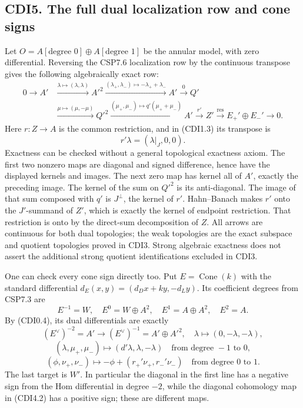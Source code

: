 \subsection{CDI5. The full dual localization row and cone
signs}\label{cdi5.-the-full-dual-localization-row-and-cone-signs}

Let \(O=A[\text{degree }0]\oplus A[\text{degree }1]\) be the annular
model, with zero differential. Reversing the CSP7.6 localization row by
the continuous transpose gives the following algebraically exact row: \[
\begin{aligned}
0\to A'&\xrightarrow{\lambda\mapsto(\lambda,\lambda)} A'^2
\xrightarrow{(\lambda_+,\lambda_-)\mapsto-\lambda_++\lambda_-}A'
\xrightarrow{0}Q'\\
&\xrightarrow{\mu\mapsto(\mu,-\mu)}Q'^2
\xrightarrow{(\mu_+,\mu_-)\mapsto q'(\mu_++\mu_-)}A'
\xrightarrow{r'}Z'\xrightarrow{\operatorname{res}}E_+'\oplus E_-'\to0.
\end{aligned}
\tag{CDI5.1}
\] Here \(r:Z\to A\) is the common restriction, and in (CDI1.3) its
transpose is \[
r'\lambda=(\lambda|_J,0,0).
\tag{CDI5.2}
\] Exactness can be checked without a general topological exactness
axiom. The first two nonzero maps are diagonal and signed difference,
hence have the displayed kernels and images. The next zero map has
kernel all of \(A'\), exactly the preceding image. The kernel of the sum
on \(Q'^2\) is its anti-diagonal. The image of that sum composed with
\(q'\) is \(J^\perp\), the kernel of \(r'\). Hahn--Banach makes \(r'\)
onto the \(J'\)-summand of \(Z'\), which is exactly the kernel of
endpoint restriction. That restriction is onto by the direct-sum
decomposition of \(Z\). All arrows are continuous for both dual
topologies; the weak topologies are the exact subspace and quotient
topologies proved in CDI3. Strong algebraic exactness does not assert
the additional strong quotient identifications excluded in CDI3.

One can check every cone sign directly too. Put
\(E=\operatorname{Cone}(k)\) with the standard differential
\(d_E(x,y)=(d_Dx+ky,-d_Ly)\). Its coefficient degrees from CSP7.3 are \[
E^{-1}=W,\quad E^0=W\oplus A^2,\quad
E^1=A\oplus A^2,\quad E^2=A.
\] By (CDI0.4), its dual differentials are exactly \[
(E^\vee)^{-2}=A'\longrightarrow(E^\vee)^{-1}=A'\oplus A'^2,
\quad \lambda\longmapsto(0,-\lambda,-\lambda),
\] \[
(\lambda,\mu_+,\mu_-)\longmapsto(d'\lambda,\lambda,-\lambda)
\quad\text{from degree }-1\text{ to }0,
\] \[
(\phi,\nu_+,\nu_-)\longmapsto
-\phi+(r_+'\nu_+,r_-'\nu_-)
\quad\text{from degree }0\text{ to }1.
\tag{CDI5.3}
\] The last target is \(W'\). In particular the diagonal in the first
line has a negative sign from the Hom differential in degree \(-2\),
while the diagonal cohomology map in (CDI4.2) has a positive sign; these
are different maps.

